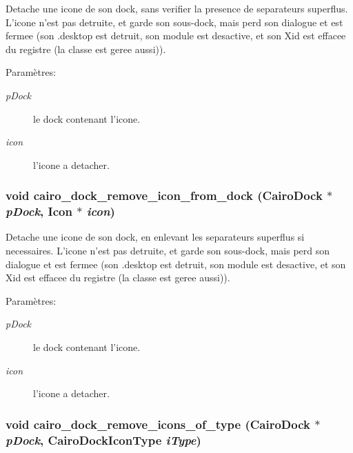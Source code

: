 Detache une icone de son dock, sans verifier la presence de separateurs superflus. L'icone n'est pas detruite, et garde son sous-dock, mais perd son dialogue et est fermee (son .desktop est detruit, son module est desactive, et son Xid est effacee du registre (la classe est geree aussi)). \begin{Desc}
\item[Paramètres:]
\begin{description}
\item[{\em pDock}]le dock contenant l'icone. \item[{\em icon}]l'icone a detacher. \end{description}
\end{Desc}
\subsubsection{\setlength{\rightskip}{0pt plus 5cm}void cairo\_\-dock\_\-remove\_\-icon\_\-from\_\-dock ({\bf CairoDock} $\ast$ {\em pDock}, {\bf Icon} $\ast$ {\em icon})}\label{cairo-dock-icons_8h_7a43c7c13c5d65eca70bb4dd5161520f}


Detache une icone de son dock, en enlevant les separateurs superflus si necessaires. L'icone n'est pas detruite, et garde son sous-dock, mais perd son dialogue et est fermee (son .desktop est detruit, son module est desactive, et son Xid est effacee du registre (la classe est geree aussi)). \begin{Desc}
\item[Paramètres:]
\begin{description}
\item[{\em pDock}]le dock contenant l'icone. \item[{\em icon}]l'icone a detacher. \end{description}
\end{Desc}
\subsubsection{\setlength{\rightskip}{0pt plus 5cm}void cairo\_\-dock\_\-remove\_\-icons\_\-of\_\-type ({\bf CairoDock} $\ast$ {\em pDock}, {\bf CairoDockIconType} {\em iType})}\label{cairo-dock-icons_8h_b27435756459370bf38b0edb0ac912e8}


